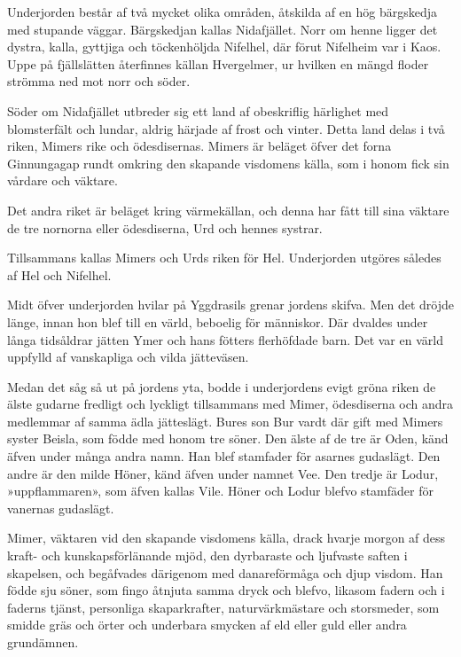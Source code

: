 Underjorden består af två mycket olika områden, åtskilda af en hög
bärgskedja med stupande väggar. Bärgskedjan kallas Nidafjället. Norr om
henne ligger det dystra, kalla, gyttjiga och töckenhöljda Nifelhel, där
förut Nifelheim var i Kaos. Uppe på fjällslätten återfinnes källan
Hvergelmer, ur hvilken en mängd floder strömma ned mot norr och söder.

Söder om Nidafjället utbreder sig ett land af obeskriflig härlighet med
blomsterfält och lundar, aldrig härjade af frost och vinter. Detta land
delas i två riken, Mimers rike och ödesdisernas. Mimers är beläget öfver
det forna Ginnungagap rundt omkring den skapande visdomens källa, som i
honom fick sin vårdare och väktare.

Det andra riket är beläget kring värmekällan, och denna har fått till
sina väktare de tre nornorna eller ödesdiserna, Urd och hennes systrar.

Tillsammans kallas Mimers och Urds riken för Hel. Underjorden utgöres
således af Hel och Nifelhel.

Midt öfver underjorden hvilar på Yggdrasils grenar jordens skifva. Men
det dröjde länge, innan hon blef till en värld, beboelig för människor.
Där dvaldes under långa
tidsåldrar\protect\hypertarget{lb1625905.xhtmlux5cux23start6}{}{}\protect\hypertarget{lb1625905.xhtmlux5cux23start6-a}{}{}\protect\hypertarget{lb1625905.xhtmlux5cux23start6-b}{}{}\protect\hypertarget{lb1625905.xhtmlux5cux23start6-c}{}{}\protect\hypertarget{lb1625905.xhtmlux5cux23start6-d}{}{}
jätten Ymer och hans fötters flerhöfdade barn. Det var en värld uppfylld
af vanskapliga och vilda jätteväsen.

Medan det såg så ut på jordens yta, bodde i underjordens evigt gröna
riken de älste gudarne fredligt och lyckligt tillsammans med Mimer,
ödesdiserna och andra medlemmar af samma ädla jätteslägt. Bures son Bur
vardt där gift med Mimers syster Beisla, som födde med honom tre söner.
Den älste af de tre är Oden, känd äfven under många andra namn. Han blef
stamfader för asarnes gudaslägt. Den andre är den milde Höner, känd
äfven under namnet Vee. Den tredje är Lodur, »uppflammaren», som äfven
kallas Vile. Höner och Lodur blefvo stamfäder för vanernas gudaslägt.

Mimer, väktaren vid den skapande visdomens källa, drack hvarje morgon af
dess kraft- och kunskapsförlänande mjöd, den dyrbaraste och ljufvaste
saften i skapelsen, och begåfvades därigenom med danareförmåga och djup
visdom. Han födde sju söner, som fingo åtnjuta samma dryck och blefvo,
likasom fadern och i faderns tjänst, personliga skaparkrafter,
naturvärkmästare och storsmeder, som smidde gräs och örter och underbara
smycken af eld eller guld eller andra grundämnen.

